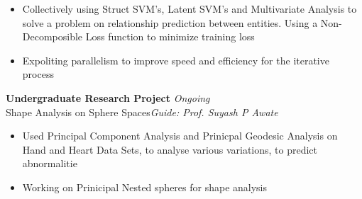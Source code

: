 \documentclass{article}
\begin{document}
\vspace{-17pt}
\begin{itemize}[itemsep = -0.75 mm, leftmargin=*]
	\item Collectively using Struct SVM's, Latent SVM's and Multivariate Analysis to solve a problem on relationship prediction between entities. Using a Non-Decomposible Loss function to minimize training loss    
    \item Expoliting parallelism to improve speed and efficiency for the iterative process 
\end{itemize}
\textbf{Undergraduate Research Project} \hfill{\sl \small Ongoing}\\
Shape Analysis on Sphere Spaces\hfill{\sl \small Guide: Prof. Suyash P Awate}\\
\vspace{-17pt}
\begin{itemize}[itemsep = -0.75 mm, leftmargin=*]
	\item Used Principal Component Analysis and Prinicpal Geodesic Analysis on Hand and Heart Data Sets, to analyse various variations, to predict abnormalitie
    \item Working on Prinicipal Nested spheres for shape analysis
\end{itemize}
\end{document}
